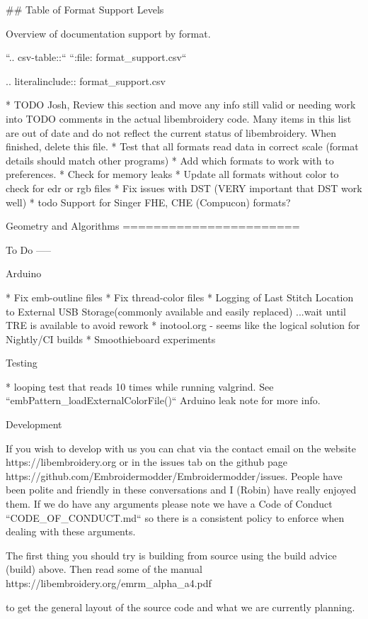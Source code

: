 \documentclass[a4paper]{report}
\begin{document}
{{{{{{{{{## Table of Format Support Levels}

Overview of documentation support by format.

``.. csv-table::``
``:file: format_support.csv``

.. literalinclude:: format_support.csv

* TODO Josh, Review this section and move any info still valid or needing work into TODO comments in the actual libembroidery code. Many items in this list are out of date and do not reflect the current status of libembroidery. When finished, delete this file.
  * Test that all formats read data in correct scale (format details should match other programs)
  * Add which formats to work with to preferences.
  * Check for memory leaks
  * Update all formats without color to check for edr or rgb files
  * Fix issues with DST (VERY important that DST work well)
* todo Support for Singer FHE, CHE (Compucon) formats?

Geometry and Algorithms
=======================

To Do
-----

Arduino
~~~~~~~

* Fix emb-outline files
* Fix thread-color files
* Logging of Last Stitch Location to External USB Storage(commonly available and easily replaced) ...wait until TRE is available to avoid rework
* inotool.org - seems like the logical solution for Nightly/CI builds
* Smoothieboard experiments

Testing
~~~~~~~

* looping test that reads 10 times while running valgrind. See ``embPattern_loadExternalColorFile()`` Arduino leak note for more info.

Development
~~~~~~~~~~~

If you wish to develop with us you can chat via the contact email
on the website https://libembroidery.org or in the issues tab on the
github page https://github.com/Embroidermodder/Embroidermodder/issues.
People have been polite and friendly in these conversations and I (Robin)
have really enjoyed them.
If we do have any arguments please note we have a
Code of Conduct ``CODE_OF_CONDUCT.md`` so there is a consistent policy to
enforce when dealing with these arguments.

The first thing you should try is building from source using the  build advice (build)
above. Then read some of the  manual
https://libembroidery.org/emrm_alpha_a4.pdf} to get the general
layout of the source code and what we are currently planning.

}}}}}}}
\end{document}
